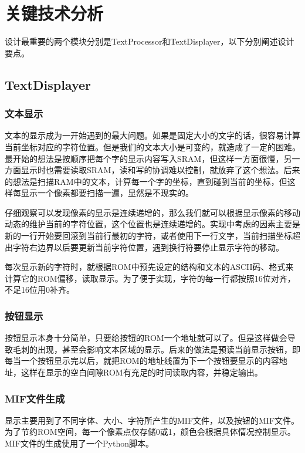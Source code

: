 \documentclass[12pt,a4paper]{article}
\begin{document}

\section{关键技术分析} %
\label{sec:关键技术分析}
设计最重要的两个模块分别是TextProcessor和TextDisplayer，以下分别阐述设计要点。

\subsection{TextDisplayer}
\subsubsection{文本显示}
文本的显示成为一开始遇到的最大问题。如果是固定大小的文字的话，很容易计算当前坐标对应的字符位置。但是我们的文本大小是可变的，就造成了一定的困难。最开始的想法是按顺序把每个字的显示内容写入SRAM，但这样一方面很慢，另一方面显示时也需要读取SRAM，读和写的协调难以控制，就放弃了这个想法。后来的想法是扫描RAM中的文本，计算每一个字的坐标，直到碰到当前的坐标，但这样每显示一个像素都要扫描一遍，显然是不现实的。

仔细观察可以发现像素的显示是连续递增的，那么我们就可以根据显示像素的移动动态的维护当前的字符位置，这个位置也是连续递增的。实现中考虑的因素主要是新的一行开始要回滚到当前行最初的字符，或者使用下一行文字，当前扫描坐标超出字符右边界以后要更新当前字符位置，遇到换行符要停止显示字符的移动。

每次显示新的字符时，就根据ROM中预先设定的结构和文本的ASCII码、格式来计算它的ROM偏移，读取显示。为了便于实现，字符的每一行都按照16位对齐，不足16位用0补齐。

\subsubsection{按钮显示}
按钮显示本身十分简单，只要给按钮的ROM一个地址就可以了。但是这样做会导致毛刺的出现，甚至会影响文本区域的显示。后来的做法是预读当前显示按钮，即每当一个按钮显示完以后，就把ROM的地址线置为下一个按钮要显示的内容地址，这样在显示的空白间隙ROM有充足的时间读取内容，并稳定输出。

\subsubsection{MIF文件生成}
显示主要用到了不同字体、大小、字符所产生的MIF文件，以及按钮的MIF文件。为了节约ROM空间，每一个像素点仅存储0或1，颜色会根据具体情况控制显示。MIF文件的生成使用了一个Python脚本。
\end{document}
